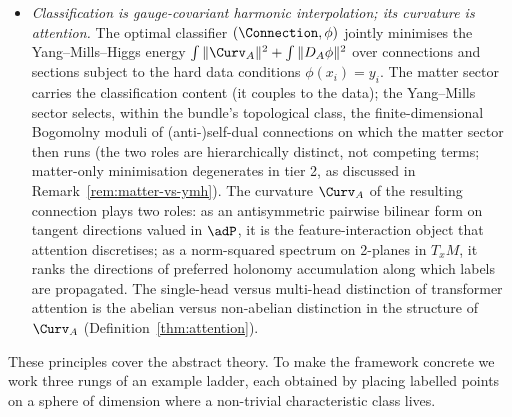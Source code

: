 \begin{itemize}[leftmargin=2em]
\item[(P3)] \textit{Classification is gauge-covariant harmonic
interpolation; its curvature is attention.} The optimal classifier
$(\Connection,\phi)$ jointly minimises the Yang--Mills--Higgs energy
$\int\|\Curv_A\|^2+\int\|D_A\phi\|^2$ over connections and sections
subject to the hard data conditions $\phi(x_i)=y_i$. The matter
sector carries the classification content (it couples to the data);
the Yang--Mills sector selects, within the bundle's topological
class, the finite-dimensional Bogomolny moduli of (anti-)self-dual
connections on which the matter sector then runs (the two roles are
hierarchically distinct, not competing terms; matter-only
minimisation degenerates in tier 2, as discussed in
Remark~\ref{rem:matter-vs-ymh}). The curvature $\Curv_A$ of the
resulting connection plays two roles: as an antisymmetric pairwise
bilinear form on tangent directions valued in $\adP$, it is the
feature-interaction object that attention discretises; as a
norm-squared spectrum on 2-planes in $T_xM$, it ranks the
directions of preferred holonomy accumulation along which labels
are propagated. The single-head versus multi-head distinction of
transformer attention is the abelian versus non-abelian distinction
in the structure of $\Curv_A$ (Definition~\ref{thm:attention}).
\end{itemize}

These principles cover the abstract theory. To make the framework
concrete we work three rungs of an example ladder, each obtained by
placing labelled points on a sphere of dimension where a non-trivial
characteristic class lives.

